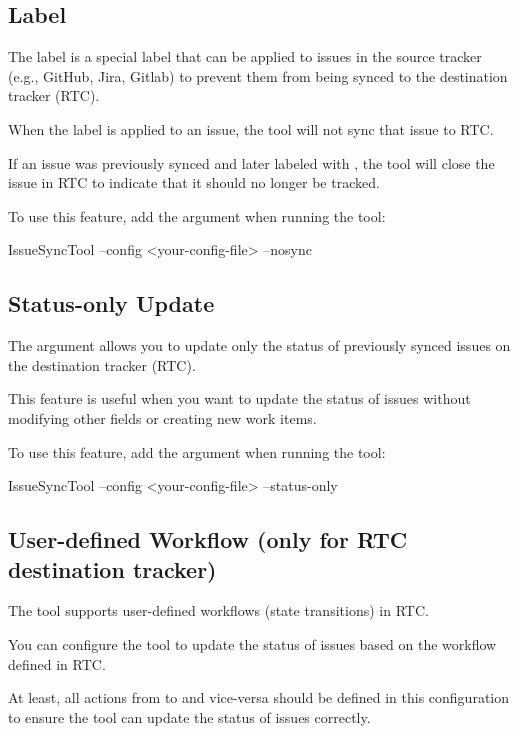 \subsection{ Label}
The  label is a special label that can be applied to issues in the
source tracker (e.g., GitHub, Jira, Gitlab) to prevent them from being synced to
the destination tracker (RTC).

When the  label is applied to an issue, the tool will not sync that
issue to RTC.

If an issue was previously synced and later labeled with , the tool
will close the issue in RTC to indicate that it should no longer be tracked.

To use this feature, add the  argument when running the tool:

\begin{pythonlog}
IssueSyncTool --config <your-config-file> --nosync
\end{pythonlog}

\subsection{Status-only Update}
The  argument allows you to update only the status of
previously synced issues on the destination tracker (RTC).

This feature is useful when you want to update the status of issues without
modifying other fields or creating new work items.

To use this feature, add the  argument when running the tool:

\begin{pythonlog}
IssueSyncTool --config <your-config-file> --status-only
\end{pythonlog}

\newpage
\subsection{User-defined Workflow (only for RTC destination tracker)}
The tool supports user-defined workflows (state transitions) in RTC.

You can configure the tool to update the status of issues based on the workflow
defined in RTC.

At least, all actions from  to  and vice-versa should be
defined in this configuration to ensure the tool can update the status of issues
correctly.

